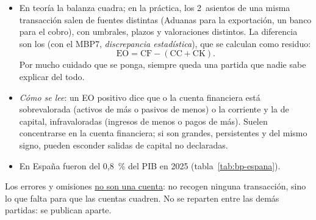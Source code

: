 \documentclass[11pt]{article}
\begin{document}
\begin{itemize}
\item En teoría la balanza cuadra; en la práctica, los 2~asientos de una misma transacción salen de fuentes distintas (Aduanas para la exportación, un banco para el cobro), con umbrales, plazos y valoraciones distintos. La diferencia son los  (con el MBP7, \emph{discrepancia estadística}), que se calculan como residuo:
\begin{equation}\label{eq:errores-omisiones}
\mathrm{EO}=\mathrm{CF}-\left(\mathrm{CC}+\mathrm{CK}\right).
\end{equation}
Por mucho cuidado que se ponga, siempre queda una partida que nadie sabe explicar del todo.
\item \emph{Cómo se lee}: un EO positivo dice que o la cuenta financiera está sobrevalorada (activos de más o pasivos de menos) o la corriente y la de capital, infravaloradas (ingresos de menos o pagos de más). Suelen concentrarse en la cuenta financiera; si son grandes, persistentes y del mismo signo, pueden esconder salidas de capital no declaradas.
\item En España fueron del 0,8~\% del PIB en 2025 (tabla~\ref{tab:bp-espana})\nocite{BdE2026BE17}.
\end{itemize}

\begin{notaopositor}
Los errores y omisiones \uline{no son una cuenta}: no recogen ninguna transacción, sino lo que falta para que las cuentas cuadren. No se reparten entre las demás partidas: se publican aparte.
\end{notaopositor}
\end{document}
